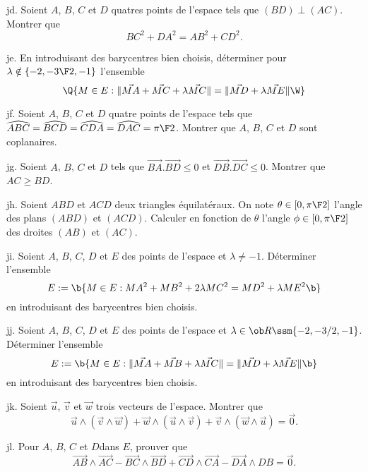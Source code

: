 \exo [Level=1,Fight=2,Learn=0,Field=\GéométrieSpatiale,Type=\Exercices,Origin=] jd. 
Soient $A$, $B$, $C$ et $D$ quatres points de l'espace tels que $(BD)\perp(AC)$. Montrer que 
$$
BC^2+DA^2=AB^2+CD^2.
$$

\exo [Level=1,Fight=0,Learn=0,Field=\GéométrieSpatiale,Type=\Exercices,Origin=] je. 
En introduisant des barycentres bien choisis, déterminer pour $\lambda\notin\{-2,-{3\F2},-1\}$ l'ensemble 
$$
\Q\{M\in\sc E:\|\vec{MA}+\vec{MC}+\lambda\vec{MC}\|=\|\vec{MD}+\lambda\vec{ME}\|\W\}
$$

\exo  [Level=1,Fight=2,Learn=0,Field=\GéométrieSpatiale,Type=\Exercices,Origin=] jf. 
Soient $A$, $B$, $C$ et $D$ quatre points de l'espace tels que $\widehat{ABC}=\widehat{BCD}=\widehat{CDA}
=\widehat{DAC}={\pi\F 2}$. Montrer que $A$, $B$, $C$ et $D$ sont coplanaires. 

\exo  [Level=1,Fight=2,Learn=0,Field=\GéométrieSpatiale,Type=\Exercices,Origin=] jg. 
Soient $A$, $B$, $C$ et $D$ tels que $\vec{BA}.\vec{BD}\le 0$ et $\vec{DB}.\vec{DC}\le0$. Montrer que $AC\ge BD$. 

\exo  [Level=1,Fight=2,Learn=0,Field=\GéométrieSpatiale,Type=\Exercices,Origin=] jh. 
Soient $ABD$ et $ACD$ deux triangles équilatéraux. On note $\theta\in[0,{\pi\F2}]$ l'angle des plans $(ABD)$ et $(ACD)$. Calculer en fonction de $\theta$ l'angle $\phi\in[0,{\pi\F2}]$ des droites $(AB)$ et $(AC)$. 

\exo  [Level=1,Fight=1,Learn=0,Field=\GéométrieSpatiale,Type=\Exercices,Origin=] ji. 
Soient $A$, $B$, $C$, $D$ et $E$ des points de l'espace et $\lambda\neq-1$. Déterminer l'ensemble 
$$
E:=\b\{M\in\sc E:MA^2+MB^2+2\lambda MC^2=MD^2+\lambda ME^2\b\}
$$
en introduisant des barycentres bien choisis. 

\exo  [Level=1,Fight=1,Learn=0,Field=\GéométrieSpatiale,Type=\Exercices,Origin=] jj.  
Soient $A$, $B$, $C$, $D$ et $E$ des points de l'espace et $\lambda\in\ob R\ssm\{-2,-3/2,-1\}$. Déterminer l'ensemble 
$$
E:=\b\{M\in\sc E:\|\vec{MA}+\vec{MB}+\lambda\vec{MC}\|=\|\vec{MD}+\lambda\vec{ME}\|\b\}
$$
en introduisant des barycentres bien choisis. 

\exo  [Level=1,Fight=0,Learn=0,Field=\GéométrieSpatiale,Type=\Exercices,Origin=] jk. 
Soient $\vec u$, $\vec v$ et $\vec w$ trois vecteurs de l'espace. Montrer que 
$$
\vec u\wedge(\vec v\wedge\vec w)+\vec w\wedge(\vec u\wedge\vec v)+\vec v\wedge(\vec w\wedge\vec u)=\vec 0. 
$$

\exo  [Level=1,Fight=1,Learn=0,Field=\GéométrieSpatiale,Type=\Exercices,Origin=] jl. 
Pour $A$, $B$, $C$ et $D$dans $E$, prouver que 
$$
\vec{AB}\wedge\vec{AC}-\vec{BC}\wedge\vec{BD}+\vec{CD}\wedge\vec{CA}-\vec{DA}\wedge{DB}=\vec 0.
$$


